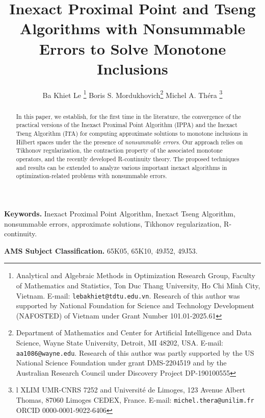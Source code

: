 \documentclass[12pt]{article}
\theoremstyle{plain}
\begin{document}
\title{Inexact Proximal Point and Tseng Algorithms with Nonsummable Errors to Solve Monotone Inclusions}
\author{Ba Khiet Le \thanks{Analytical and Algebraic Methods in Optimization Research Group, Faculty of Mathematics and Statistics, Ton Duc Thang University, Ho Chi Minh City, Vietnam.
 E-mail: \texttt{lebakhiet@tdtu.edu.vn}. Research of this author was  supported by National Foundation for Science and
Technology Development (NAFOSTED) of Vietnam under Grant Number
101.01-2025.61}  \qquad Boris S. Mordukhovich\thanks{Department of Mathematics and Center for Artificial Intelligence and Data Science, Wayne State University, Detroit, MI 48202, USA.
 E-mail: \texttt{aa1086@wayne.edu}. Research of this author was partly supported by the US National Science Foundation under grant DMS-2204519 and by the Australian Research Council under Discovery Project DP-190100555} \qquad Michel  A. Th\' era \thanks{l XLIM UMR-CNRS 7252 and Universit\'{e} de Limoges,   123 Avenue Albert Thomas,
87060 Limoges CEDEX, France.  E-mail: \texttt{michel.thera@unilim.fr} ORCID 0000-0001-9022-6406}}
\maketitle


\begin{abstract}
In this paper, we establish, for the first time in the literature, the convergence of the practical versions of the Inexact Proximal Point Algorithm (IPPA) and the Inexact Tseng Algorithm (ITA) for computing approximate solutions to monotone inclusions in Hilbert spaces under the the presence of {\it nonsummable errors}. Our approach relies on Tikhonov regularization, the contraction property of the associated monotone operators, and the recently developed R-continuity theory. The proposed techniques and results can be extended to analyze various important inexact algorithms in optimization-related problems  with nonsummable errors.
\end{abstract}

{\bf Keywords.} Inexact Proximal Point Algorithm, Inexact Tseng Algorithm, nonsummable errors, approximate solutions, Tikhonov regularization, R-continuity.


{\bf AMS Subject Classification.}  65K05, 65K10, 49J52, 49J53.
\end{document}
